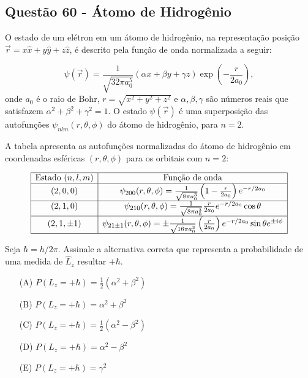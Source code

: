 \documentclass[a4paper,12pt]{article}
\begin{document}
\begin{flushleft}
\subsection{Quest\~ao 60 - \'Atomo de Hidrogênio} 

O estado de um elétron em um átomo de hidrogênio, na representação posição 
\(\vec{r} = x \hat{x} + y \hat{y} + z \hat{z}\), é descrito pela função de onda normalizada a seguir:

\[
\psi(\vec{r}) = \frac{1}{\sqrt{32 \pi a_0^5}} (\alpha x + \beta y + \gamma z)\exp\left(-\frac{r}{2a_0}\right),
\]
onde \(a_0\) é o raio de Bohr, \(r=\sqrt{x^2+y^2+z^2}\) e \(\alpha,\beta,\gamma\) são números reais que satisfazem \(\alpha^2+\beta^2+\gamma^2=1\). O estado \(\psi(\vec{r})\) é uma superposição das autofunções \(\psi_{nlm}(r,\theta,\phi)\) do átomo de hidrogênio, para \(n=2\).  

A tabela apresenta as autofunções normalizadas do átomo de hidrogênio em coordenadas esféricas \((r,\theta,\phi)\) para os orbitais com \(n=2\):

\[
\begin{array}{|c|c|}
\hline
\text{Estado } (n,l,m) & \text{Função de onda} \\ \hline
(2,0,0) & \psi_{200}(r,\theta,\phi) = \frac{1}{\sqrt{8\pi a_0^3}}\left(1-\frac{r}{2a_0}\right)e^{-r/2a_0} \\ \hline
(2,1,0) & \psi_{210}(r,\theta,\phi) = \frac{1}{\sqrt{8\pi a_0^3}} \frac{r}{2a_0} e^{-r/2a_0}\cos\theta \\ \hline
(2,1,\pm 1) & \psi_{21\pm1}(r,\theta,\phi) = \pm \frac{1}{\sqrt{16\pi a_0^3}}\left(\frac{r}{2a_0}\right)e^{-r/2a_0}\sin\theta e^{\pm i\phi} \\ \hline
\end{array}
\]

Seja \(\hbar=h/2\pi\). Assinale a alternativa correta que representa a probabilidade de uma medida de \(\hat{L}_z\) resultar \(+\hbar\).

\begin{itemize}
\item[(A)] \(P(L_z=+\hbar)=\tfrac{1}{2}(\alpha^2+\beta^2)\)
\item[(B)] \(P(L_z=+\hbar)=\alpha^2+\beta^2\)
\item[(C)] \(P(L_z=+\hbar)=\tfrac{1}{2}(\alpha^2-\beta^2)\)
\item[(D)] \(P(L_z=+\hbar)=\alpha^2-\beta^2\)
\item[(E)] \(P(L_z=+\hbar)=\gamma^2\)
\end{itemize}


\end{flushleft}
\end{document}
